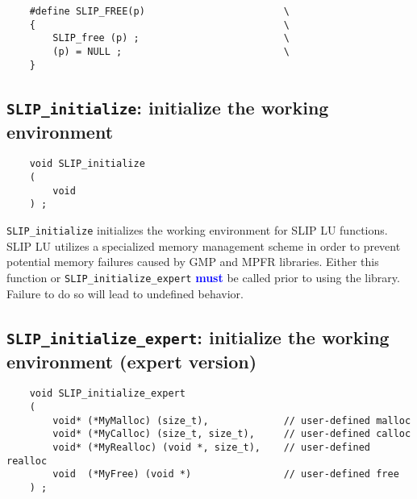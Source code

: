 \documentclass[12pt]{article}
\theoremstyle{definition}
\begin{document}
\begin{mdframed}[userdefinedwidth=6in]
{\footnotesize
\begin{verbatim}
    #define SLIP_FREE(p)                        \
    {                                           \
        SLIP_free (p) ;                         \
        (p) = NULL ;                            \
    }
\end{verbatim}
} \end{mdframed}

\cprotect\subsection{\verb|SLIP_initialize|: initialize the working environment}

\begin{mdframed}[userdefinedwidth=6in]
{\footnotesize
\begin{verbatim}
    void SLIP_initialize
    (
        void
    ) ;
\end{verbatim}
} \end{mdframed}

\verb|SLIP_initialize| initializes the working environment for SLIP LU
functions.  SLIP LU utilizes a specialized memory management scheme in order to
prevent potential memory failures caused by GMP and MPFR libraries.  Either
this function or \verb'SLIP_initialize_expert' \textcolor{blue}{\textbf{must}}
be called prior to using the library.  Failure to do so will lead to undefined
behavior.

\cprotect\subsection{\verb|SLIP_initialize_expert|: initialize the working environment (expert version)}\label{ss:SLIP_initialize_expert}

\begin{mdframed}[userdefinedwidth=6in]
{\footnotesize
\begin{verbatim}
    void SLIP_initialize_expert
    (
        void* (*MyMalloc) (size_t),             // user-defined malloc
        void* (*MyCalloc) (size_t, size_t),     // user-defined calloc
        void* (*MyRealloc) (void *, size_t),    // user-defined realloc
        void  (*MyFree) (void *)                // user-defined free
    ) ;
\end{verbatim}
} \end{mdframed}
\end{document}
